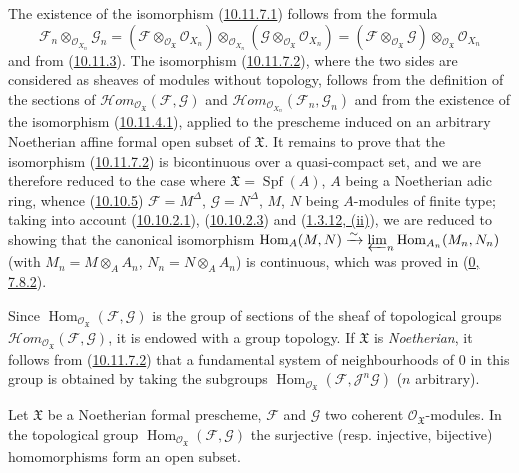 The existence of the isomorphism
(\hyperref[I.10.11.7.1]{10.11.7.1}) follows from the formula
\[
  \mathscr{F}_n\otimes_{\mathscr{O}_{X_n}}\mathscr{G}_n
  =
  (\mathscr{F}\otimes_{\mathscr{O}_{\mathfrak{X}}}
  \mathscr{O}_{X_n})
  \otimes_{\mathscr{O}_{X_n}}
  (\mathscr{G}\otimes_{\mathscr{O}_{\mathfrak{X}}}
  \mathscr{O}_{X_n})
  =
  (\mathscr{F}\otimes_{\mathscr{O}_{\mathfrak{X}}}\mathscr{G})
  \otimes_{\mathscr{O}_{\mathfrak{X}}}\mathscr{O}_{X_n}
\]
and from (\hyperref[I.10.11.3]{10.11.3}). The isomorphism
(\hyperref[I.10.11.7.2]{10.11.7.2}), where the two sides are
considered as sheaves of modules without topology, follows from the
definition of the sections of
$\mathscr{H}\!om_{\mathscr{O}_{\mathfrak{X}}}
(\mathscr{F},\mathscr{G})$ and
$\mathscr{H}\!om_{\mathscr{O}_{X_n}}(\mathscr{F}_n,\mathscr{G}_n)$ and from
the existence of the isomorphism
(\hyperref[I.10.11.4.1]{10.11.4.1}), applied to the prescheme induced on
an arbitrary Noetherian affine formal open subset of $\mathfrak{X}$. It remains
to prove that the isomorphism
(\hyperref[I.10.11.7.2]{10.11.7.2}) is bicontinuous over a
quasi-compact set, and we are therefore reduced to the case where
$\mathfrak{X}=\operatorname{Spf}(A)$, $A$ being a Noetherian adic ring, whence
(\hyperref[I.10.10.5]{10.10.5})
$\mathscr{F}=M^\Delta$, $\mathscr{G}=N^\Delta$, $M$, $N$ being
$A$-modules of finite type; taking into account
(\hyperref[I.10.10.2.1]{10.10.2.1}),
(\hyperref[I.10.10.2.3]{10.10.2.3}) and
(\hyperref[I.1.3.12]{1.3.12, (ii)}), we are reduced to showing that
the canonical isomorphism
$\operatorname{Hom}_A(M,N)\xrightarrow{\sim}
\varprojlim_n\operatorname{Hom}_{A_n}(M_n,N_n)$ (with
$M_n=M\otimes_A A_n$, $N_n=N\otimes_A A_n$) is continuous, which was
proved in (\hyperref[0.7.8.2]{0, 7.8.2}).

\begin{env}[10.11.8]
\label{I.10.11.8}
Since $\operatorname{Hom}_{\mathscr{O}_{\mathfrak{X}}}
(\mathscr{F},\mathscr{G})$ is the group of sections of the sheaf of
topological groups
$\mathscr{H}\!om_{\mathscr{O}_{\mathfrak{X}}}
(\mathscr{F},\mathscr{G})$, it is endowed with a group topology. If
$\mathfrak{X}$ is \emph{Noetherian}, it follows from
(\hyperref[I.10.11.7.2]{10.11.7.2}) that a fundamental system of
neighbourhoods of $0$ in this group is obtained by taking the subgroups
$\operatorname{Hom}_{\mathscr{O}_{\mathfrak{X}}}
(\mathscr{F},\mathscr{J}^n\mathscr{G})$ ($n$ arbitrary).
\end{env}

\begin{proposition}[10.11.9]
\label{I.10.11.9}
Let $\mathfrak{X}$ be a Noetherian formal prescheme, $\mathscr{F}$ and
$\mathscr{G}$ two coherent $\mathscr{O}_{\mathfrak{X}}$-modules. In
the topological group
$\operatorname{Hom}_{\mathscr{O}_{\mathfrak{X}}}
(\mathscr{F},\mathscr{G})$ the surjective (resp.
injective, bijective) homomorphisms form an open subset.
\end{proposition}

